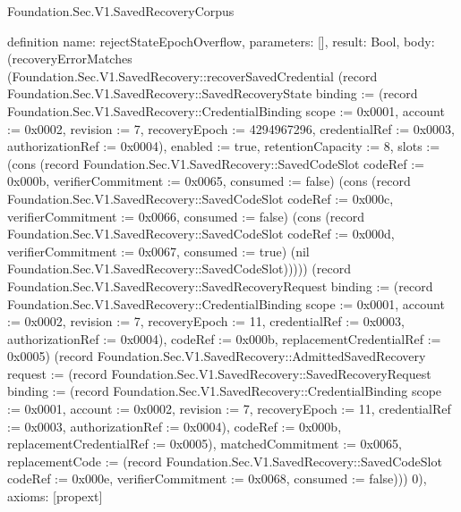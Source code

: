 \begin{lexlean}{Foundation.Sec.V1.SavedRecoveryCorpus}
\begin{semanticmodule}
definition{
  name: rejectStateEpochOverflow,
  parameters: [],
  result: Bool,
  body: (recoveryErrorMatches (Foundation.Sec.V1.SavedRecovery::recoverSavedCredential (record Foundation.Sec.V1.SavedRecovery::SavedRecoveryState {binding := (record Foundation.Sec.V1.SavedRecovery::CredentialBinding {scope := 0x0001, account := 0x0002, revision := 7, recoveryEpoch := 4294967296, credentialRef := 0x0003, authorizationRef := 0x0004}), enabled := true, retentionCapacity := 8, slots := (cons (record Foundation.Sec.V1.SavedRecovery::SavedCodeSlot {codeRef := 0x000b, verifierCommitment := 0x0065, consumed := false}) (cons (record Foundation.Sec.V1.SavedRecovery::SavedCodeSlot {codeRef := 0x000c, verifierCommitment := 0x0066, consumed := false}) (cons (record Foundation.Sec.V1.SavedRecovery::SavedCodeSlot {codeRef := 0x000d, verifierCommitment := 0x0067, consumed := true}) (nil Foundation.Sec.V1.SavedRecovery::SavedCodeSlot))))}) (record Foundation.Sec.V1.SavedRecovery::SavedRecoveryRequest {binding := (record Foundation.Sec.V1.SavedRecovery::CredentialBinding {scope := 0x0001, account := 0x0002, revision := 7, recoveryEpoch := 11, credentialRef := 0x0003, authorizationRef := 0x0004}), codeRef := 0x000b, replacementCredentialRef := 0x0005}) (record Foundation.Sec.V1.SavedRecovery::AdmittedSavedRecovery {request := (record Foundation.Sec.V1.SavedRecovery::SavedRecoveryRequest {binding := (record Foundation.Sec.V1.SavedRecovery::CredentialBinding {scope := 0x0001, account := 0x0002, revision := 7, recoveryEpoch := 11, credentialRef := 0x0003, authorizationRef := 0x0004}), codeRef := 0x000b, replacementCredentialRef := 0x0005}), matchedCommitment := 0x0065, replacementCode := (record Foundation.Sec.V1.SavedRecovery::SavedCodeSlot {codeRef := 0x000e, verifierCommitment := 0x0068, consumed := false})})) 0),
  axioms: [propext]
}


\end{semanticmodule}
\end{lexlean}
